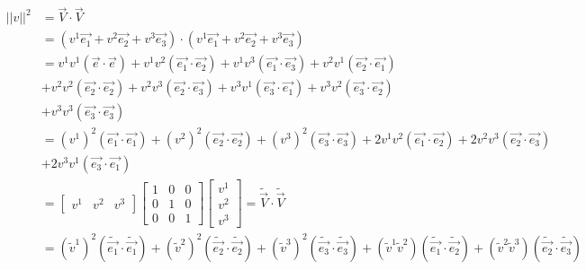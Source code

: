 \documentclass{article}
\begin{document}
	\begin{align*}
		||v||^{2} &= \overrightarrow{V}\cdot\overrightarrow{V}\\
				  &= (v^{1}\overrightarrow{e_{1}} + v^{2}\overrightarrow{e_{2}} +v^{3}\overrightarrow{e_{3}})\cdot(v^{1}\overrightarrow{e_{1}} + v^{2}\overrightarrow{e_{2}} +v^{3}\overrightarrow{e_{3}})\\
				  &= v^{1}v^{1}(\overrightarrow{e_{}}\cdot\overrightarrow{e_{}}) + v^{1}v^{2}(\overrightarrow{e_{1}}\cdot\overrightarrow{e_{2}}) + v^{1}v^{3}(\overrightarrow{e_{1}}\cdot\overrightarrow{e_{3}}) + v^{2}v^{1}(\overrightarrow{e_{2}}\cdot\overrightarrow{e_{1}})  \\
				  &+ v^{2}v^{2}(\overrightarrow{e_{2}}\cdot\overrightarrow{e_{2}}) + v^{2}v^{3}(\overrightarrow{e_{2}}\cdot\overrightarrow{e_{3}}) + v^{3}v^{1}(\overrightarrow{e_{3}}\cdot\overrightarrow{e_{1}}) + v^{3}v^{2}(\overrightarrow{e_{3}}\cdot\overrightarrow{e_{2}}) \\
				  &+ v^{3}v^{3}(\overrightarrow{e_{3}}\cdot\overrightarrow{e_{3}})\\
				  &= (v^{1})^{2}(\overrightarrow{e_{1}}\cdot\overrightarrow{e_{1}}) + (v^{2})^{2}(\overrightarrow{e_{2}}\cdot\overrightarrow{e_{2}}) + (v^{3})^{2}(\overrightarrow{e_{3}}\cdot\overrightarrow{e_{3}}) + 2 v^{1}v^{2}(\overrightarrow{e_{1}}\cdot\overrightarrow{e_{2}}) + 2v^{2}v^{3}(\overrightarrow{e_{2}}\cdot\overrightarrow{e_{3}})\\
				  &+ 2v^{3}v^{1}(\overrightarrow{e_{3}}\cdot\overrightarrow{e_{1}})\\
				  &= \begin{bmatrix}
				  	v^{1} & v^{2} & v^{3}
				  \end{bmatrix}\begin{bmatrix}
				  1 & 0 & 0\\
				  0 & 1 & 0\\
				  0 & 0 & 1
			  \end{bmatrix}\begin{bmatrix}
			  v^{1}\\
			  v^{2}\\
			  v^{3} 
		  \end{bmatrix}  = \widetilde{\overrightarrow{V}}\cdot\widetilde{\overrightarrow{V}}\\
	  			&= (\widetilde{v}^{1})^{2}(\widetilde{\overrightarrow{e_{1}}}\cdot\widetilde{\overrightarrow{e_{1}}}) + (\widetilde{v}^{2})^{2}(\widetilde{\overrightarrow{e_{2}}}\cdot\widetilde{\overrightarrow{e_{2}}}) + (\widetilde{v}^{3})^{2}(\widetilde{\overrightarrow{e_{3}}}\cdot\widetilde{\overrightarrow{e_{3}}}) + (\widetilde{v}^{1}\widetilde{v}^{2})(\widetilde{\overrightarrow{e_{1}}}\cdot\widetilde{\overrightarrow{e_{2}}}) + (\widetilde{v}^{2}\widetilde{v}^{3})(\widetilde{\overrightarrow{e_{2}}}\cdot\widetilde{\overrightarrow{e_{3}}}) \\

\end{align*}
\end{document}
